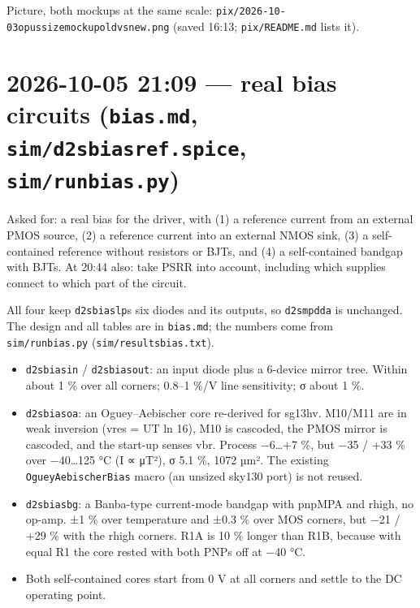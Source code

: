\documentclass[11pt,a4paper]{article}
\providecommand{\tightlist}{\setlength{\itemsep}{0pt}\setlength{\parskip}{0pt}}
\renewcommand{\_}{\textunderscore\hspace{0pt}}
\begin{document}
Picture, both mockups at the same scale:
\texttt{pix/2026-10-03\_opus\_size\_mockup\_old\_vs\_new.png}
(saved 16:13; \texttt{pix/README.md} lists it).

\hypertarget{2026-10-05-2109--real-bias-circuits-biasmd-simd2s_bias_refspice-simrun_biaspy}{%
\section{\texorpdfstring{2026-10-05 21:09 --- real
bias circuits (\texttt{bias.md},
\texttt{sim/d2s\_bias\_ref.spice},
\texttt{sim/run\_bias.py})}{2026-10-05 21:09 --- real bias circuits (bias.md, sim/d2s\_bias\_ref.spice, sim/run\_bias.py)}}\label{2026-10-05-2109--real-bias-circuits-biasmd-simd2s_bias_refspice-simrun_biaspy}}

Asked for: a real bias for the driver, with (1) a
reference current from an external PMOS source,
(2) a reference current into an external NMOS
sink, (3) a self-contained reference without
resistors or BJTs, and (4) a self-contained
bandgap with BJTs. At 20:44 also: take PSRR into
account, including which supplies connect to which
part of the circuit.

All four keep
\texttt{d2s\_bias\_lp}\textquotesingle s six
diodes and its outputs, so \texttt{d2s\_mpdda} is
unchanged. The design and all tables are in
\texttt{bias.md}; the numbers come from
\texttt{sim/run\_bias.py}
(\texttt{sim/results\_bias.txt}).

\begin{itemize}
\tightlist
\item
  \texttt{d2s\_bias\_in} /
  \texttt{d2s\_bias\_out}: an input diode plus a
  6-device mirror tree. Within about 1 \% over all
  corners; 0.8--1 \%/V line sensitivity; σ about 1
  \%.
\item
  \texttt{d2s\_bias\_oa}: an Oguey--Aebischer core
  re-derived for sg13\_hv. M10/M11 are in weak
  inversion (vres = U\_T ln 16), M10 is cascoded,
  the PMOS mirror is cascoded, and the start-up
  senses vbr. Process −6\ldots+7 \%, but −35 / +33
  \% over −40\ldots125 °C (I ∝ μT²), σ 5.1 \%,
  1072 µm². The existing
  \texttt{OgueyAebischerBias} macro (an unsized
  sky130 port) is not reused.
\item
  \texttt{d2s\_bias\_bg}: a Banba-type
  current-mode bandgap with pnpMPA and rhigh, no
  op-amp. ±1 \% over temperature and ±0.3 \% over
  MOS corners, but −21 / +29 \% with the rhigh
  corners. R1A is 10 \% longer than R1B, because
  with equal R1 the core rested with both PNPs off
  at −40 °C.
\item
  Both self-contained cores start from 0 V at all
  corners and settle to the DC operating point.
\end{itemize}
\end{document}
